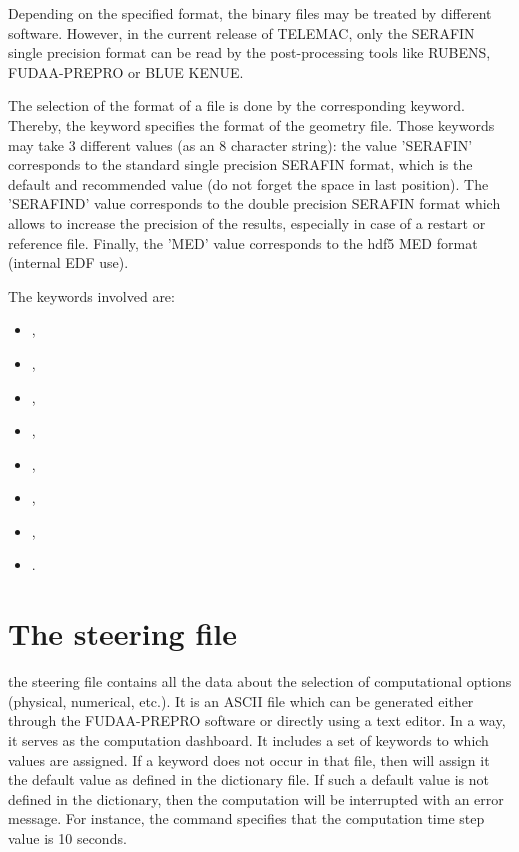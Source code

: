 Depending on the specified format, the binary files may be treated by different
software. However, in the current release of TELEMAC, only the SERAFIN single
precision format can be read by the post-processing tools like RUBENS,
FUDAA-PREPRO or BLUE KENUE.

The selection of the format of a file is done by the corresponding keyword.
Thereby, the keyword  specifies the format of the
geometry file. Those keywords may take 3 different values (as an 8 character
string): the value 'SERAFIN' corresponds to the standard single precision
SERAFIN format, which is the default and recommended value (do not forget the
space in last position). The 'SERAFIND' value corresponds to the double
precision SERAFIN format which allows to increase the precision of the results,
especially in case of a restart or reference file. Finally, the 'MED' value
corresponds to the hdf5 MED format (internal EDF use).

The keywords involved are:

\begin{itemize}
\item {},

\item {},

\item {},

\item {},

\item {},

\item {},

\item {},

\item {}.
\end{itemize}

\section{The steering file}

the steering file contains all the data about the selection of computational
options (physical, numerical, etc.). It is an ASCII file which can be generated
either through the FUDAA-PREPRO software or directly using a text
editor. In a way, it serves as the computation dashboard. It includes a set of
keywords to which values are assigned. If a keyword does not occur in that
file, then  will assign it the default value as defined in the
dictionary file. If such a default value is not defined in the dictionary, then
the computation will be interrupted with an error message. For instance, the
command  specifies that the computation time step
value is 10 seconds.

